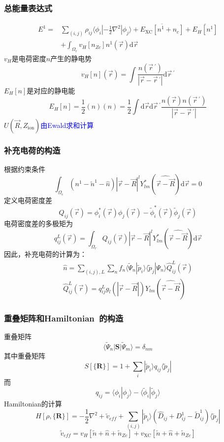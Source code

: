 \documentclass[cjk,slidestop,compress,mathserif,blue]{beamer}
\begin{document}
\frame
{
	\frametitle{总能量表达式}
	\begin{displaymath}
		\begin{aligned}
			E^1=&\sum_{(i,j)}\rho_{ij}\langle\phi_i|-\frac12\nabla^2|\phi_j\rangle+\overline{E_{\mathrm{XC}}[n^1+n_c]}+\overline{E_H[n^1]}\\
			&+\int_{\Omega_r}v_H[n_{Zc}]n^1(\vec r)\mathrm{d}\vec r
		\end{aligned}
	\end{displaymath}
	$v_H$是电荷密度$n$产生的静电势
	$$v_H[n](\vec r)=\int\dfrac{n(\vec r\,^{\prime})}{|\vec r-\vec r\,^{\prime}|}\mathrm{d}\vec r\,^{\prime}$$
	$E_H[n]$是对应的静电能
	$$E_H[n]=\dfrac12(n)(n)=\dfrac12\int\mathrm{d}\vec r\mathrm{d}\vec r\,^{\prime}\dfrac{n(\vec r)n(\vec r\,^{\prime})}{|\vec r-\vec r\,^{\prime}|}$$ 
	$U(\vec R,Z_{\mathrm{ion}})$\textcolor{blue}{由\textrm{Ewald}求和计算}
}

\frame
{
	\frametitle{补充电荷的构造}
	根据约束条件
	\begin{displaymath}
		\int_{\Omega_c}(n^1-\tilde n^1-\hat n)|\vec r-\vec R|^lY_{lm}^{\ast}(\widehat{\vec r-\vec R})\mathrm{d}\vec r=0
	\end{displaymath}
	定义电荷密度差
	\begin{displaymath}
		Q_{ij}(\vec r)=\phi_i^{\ast}(\vec r)\phi_j(\vec r)-\tilde\phi_i^{\ast}(\vec r)\tilde\phi_j(\vec r)
	\end{displaymath}
	电荷密度差的多极矩为
	\begin{displaymath}
		q_{ij}^L(\vec r)=\int_{\Omega_r}Q_{ij}(\vec r)|\vec r-\vec R|^lY_{lm}^{\ast}(\widehat{\vec r-\vec R})\mathrm{d}\vec r
	\end{displaymath}
	因此，补充电荷的计算为：
	\begin{displaymath}
		\begin{aligned}
			\hat n=\sum_{(i,j),L}\sum_n f_n\langle\tilde\Psi_n|\tilde p_i\rangle\langle\tilde p_j|\Psi_n\rangle\hat Q_{ij}^L(\vec r)\\
			\hat Q_{ij}^L(\vec r)=q_{ij}^Lg_l(|\vec r-\vec R|)Y_{lm}(\widehat{\vec r-\vec R})
		\end{aligned}
	\end{displaymath}
}

\frame
{
	\frametitle{重叠矩阵和\textrm{Hamiltonian~}的构造}
重叠矩阵
	\begin{displaymath}
		\langle\tilde\Psi_n|\mathbf{S}|\tilde\Psi_m\rangle=\delta_{nm}
	\end{displaymath}
	其中重叠矩阵$$S[\{\mathbf{R}\}]=1+\sum_i|\tilde p_i\rangle q_{ij}\langle\tilde p_j|$$
	而$$q_{ij}=\langle\phi_i|\phi_j\rangle-\langle\tilde\phi_i|\tilde\phi_j\rangle$$
	\textrm{Hamiltonian}的计算
	\begin{displaymath}
		H[\rho,\{\mathbf{R}\}]=-\dfrac12\nabla^2+\tilde v_{e\!f\!f}+\sum_{(i,j)}|\tilde p_i\rangle(\hat D_{ij}+D_{ij}^1-\tilde D_{ij}^1)\langle\tilde p_j|	
	\end{displaymath}
	$$\tilde v_{e\!f\!f}=v_H[\tilde n+\hat n+\tilde n_{Zc}]+v_{\mathrm{XC}}[\tilde n+\hat n+\tilde n_{Zc}]$$
}
\end{document}
